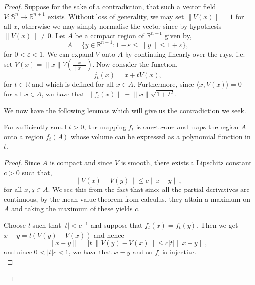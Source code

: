\begin{proof}
Suppose for the sake of a contradiction, that such a vector field $V:\mathbb{S}^n\to\mathbb{R}^{n+1}$ exists. Without loss of generality, we may set $\|V(x)\|=1$ for all $x$, otherwise we may simply normalise the vector since by hypothesis $\|V(x)\|\neq 0$. Let $A$ be a compact region of $\mathbb{R}^{n+1}$ given by,
\[
A=\{y\in\mathbb{R}^{n+1}:1-\varepsilon\leq\|y\|\leq 1+\varepsilon\},
\] 
for $0<\varepsilon<1$. We can expand $V$ onto $A$ by continuing linearly over the rays, i.e. set $V(x)=\|x\|V(\frac{x}{\|x\|})$. Now consider the function,
\[
f_t(x)=x+tV(x),
\]
for $t\in\mathbb{R}$ and which is defined for all $x\in A$. Furthermore, since $\langle x,V(x)\rangle=0$ for all $x\in A$, we have that $\|f_t(x)\|=\|x\|\sqrt{1+t^2}$.

We now have the following lemmas which will give us the contradiction we seek.
\begin{lemma}
For sufficiently small $t>0$, the mapping $f_t$ is one-to-one and maps the region $A$ onto a region $f_t(A)$ whose volume can be expressed as a polynomial function in $t$.
\end{lemma}
\begin{proof}
Since $A$ is compact and since $V$ is smooth, there exists a Lipschitz constant $c>0$ such that,
\[
\|V(x)-V(y)\|\leq c\|x-y\|,
\]
for all $x,y\in A$. We see this from the fact that since all the partial derivatives are continuous, by the mean value theorem from calculus, they attain a maximum on $A$ and taking the maximum of these yields $c$.

Choose $t$ such that $|t|<c^{-1}$ and suppose that $f_t(x)=f_t(y)$. Then we get $x-y=t(V(y)-V(x))$ and hence \[\|x-y\|=|t|\|V(y)-V(x)\|\leq c|t|\|x-y\|,\] and since $0<|t|c<1$, we have that $x=y$ and so $f_t$ is injective.\\


\end{proof}
\end{proof}
